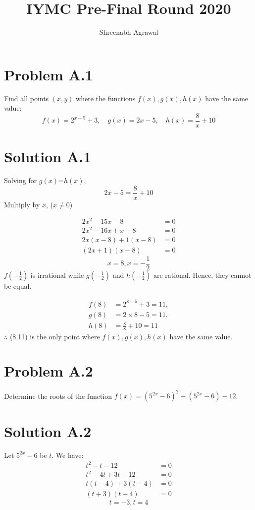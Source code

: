 \documentclass{article}
\author{Shreenabh Agrawal}
\title{IYMC Pre-Final Round 2020}
\begin{document}
\maketitle
\newpage

\section*{Problem A.1}
Find all points $(x, y)$ where the functions $f(x), g(x), h(x)$ have the same value:
\[
f(x)=2^{x-5}+3, \quad g(x)=2 x-5, \quad h(x)=\frac{8}{x}+10
\]
\section*{Solution A.1}
Solving for $g(x)$=$h(x)$,
\[2x-5=\frac{8}{x}+10\]
Multiply by $x$, ($x\neq0$)

\begin{align*}
2x^2-15x-8&=0 \\
2x^2-16x+x-8&=0 \\
2x(x-8)+1(x-8)&=0\\
(2x+1)(x-8)&=0
\end{align*}
\[\boxed{x=8, x=-\frac{1}{2}}\]
$f\left(-\frac{1}{2}\right)$ is irrational while $g\left(-\frac{1}{2}\right)$ and $h\left(-\frac{1}{2}\right)$ are rational. Hence, they cannot be equal.

\begin{align*}
    f(8)&=2^{8-5}+3=11, \\
    g(8)&=2\times8-5=11, \\
    h(8)&=\frac{8}{8}+10=11
\end{align*}
$\therefore$ (8,11) is the only point where $f(x), g(x), h(x)$ have the same value.

\newpage
\section*{Problem A.2}
Determine the roots of the function $f(x)={\left(5^{2 x}-6\right)}^{2}-\left(5^{2 x}-6\right)-12$.
\section*{Solution A.2}
Let $5^{2x}-6$ be $t$. We have:
\begin{align*}
    t^2-t-12&=0 \\
    t^2-4t+3t-12&=0 \\
    t(t-4)+3(t-4)&=0 \\
    (t+3)(t-4)&=0
\end{align*}
\[\boxed{t=-3, t=4}\]
\end{document}
